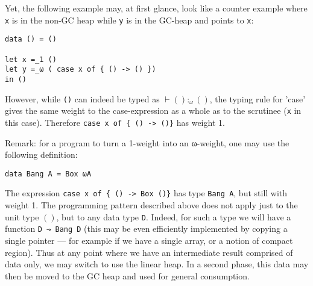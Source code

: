 \documentclass[11pt]{article}
\begin{document}













Yet, the following example may, at first glance, look like a counter
example where \verb|x| is in the non-GC heap while \verb|y| is in the
GC-heap and points to \verb|x|:
\begin{verbatim}
data () = ()

let x =_1 ()
let y =_ω ( case x of { () -> () })
in ()
\end{verbatim}
However, while \verb|()| can indeed be typed as $⊢ () :_ω ()$, the
typing rule for 'case' gives the same weight to the case-expression as
a whole as to the scrutinee (\verb|x| in this case). Therefore
\verb|case x of { () -> ()}| has weight 1.

Remark: for a program to turn a 1-weight into an ω-weight, one may use
the following definition:
\begin{verbatim}
data Bang A = Box ωA
\end{verbatim}
The expression \verb|case x of { () -> Box ()}| has type
\verb|Bang A|, but still with weight 1.  The programming pattern described above does not apply
just to the unit type $()$, but to any data type \verb|D|. Indeed, for such
a type we will have a function \verb|D ⊸ Bang D| (this may be even
efficiently implemented by copying a single pointer --- for example if
we have a single array, or a notion of compact region).  Thus at any
point where we have an intermediate result comprised of data only, we
may switch to use the linear heap. In a second phase, this data may
then be moved to the GC heap and used for general consumption.
\end{document}
